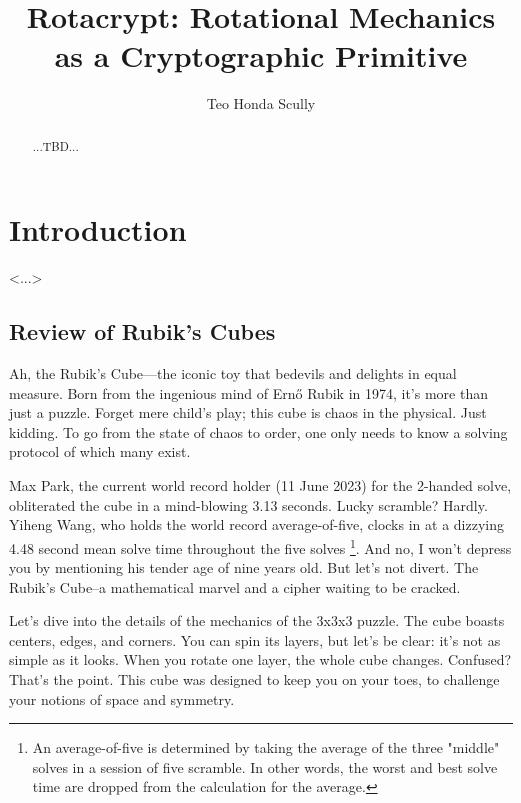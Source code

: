 \documentclass[12pt]{article}
\title{Rotacrypt: Rotational Mechanics as a Cryptographic Primitive}
\author{Teo Honda Scully}
\date{}
\begin{document}
\maketitle

\begin{abstract}
...TBD...
\end{abstract}

\tableofcontents

\newpage

\section{Introduction}
<...>

\subsection{Review of Rubik's Cubes}
Ah, the Rubik's Cube—the iconic toy that bedevils and delights in equal measure. Born from the ingenious mind of Ernő Rubik in 1974, it's more than just a puzzle. Forget mere child's play; this cube is chaos in the physical. Just kidding. To go from the state of chaos to order, one only needs to know a solving protocol of which many exist.

Max Park, the current world record holder (11 June 2023) for the 2-handed solve, obliterated the cube in a mind-blowing 3.13 seconds. Lucky scramble? Hardly. Yiheng Wang, who holds the world record average-of-five, clocks in at a dizzying 4.48 second mean solve time throughout the five solves \footnote{An average-of-five is determined by taking the average of the three "middle" solves in a session of five scramble. In other words, the worst and best solve time are dropped from the calculation for the average.}. And no, I won't depress you by mentioning his tender age of nine years old. But let's not divert. The Rubik's Cube--a mathematical marvel and a cipher waiting to be cracked. 

Let's dive into the details of the mechanics of the 3x3x3 puzzle. The cube boasts centers, edges, and corners. You can spin its layers, but let's be clear: it's not as simple as it looks. When you rotate one layer, the whole cube changes. Confused? That's the point. This cube was designed to keep you on your toes, to challenge your notions of space and symmetry.
\end{document}
